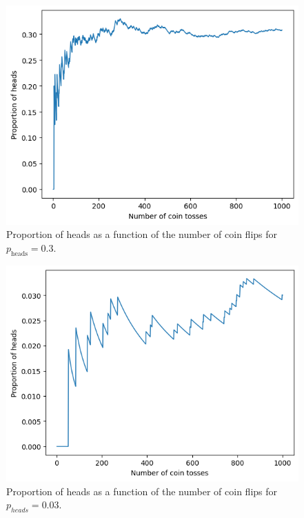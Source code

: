 \begin{ex}~
  \inputminted{python}{../code/01-21.py}

  \begin{figure}[H]
    \centering
    \includegraphics[scale=0.8]{../images/01-21a}
    \caption{Proportion of heads as a function of the number of coin flips for
      $p_\text{heads}=0.3$.}
  \end{figure}

  \begin{figure}[H]
    \centering
    \includegraphics[scale=0.8]{../images/01-21b}
    \caption{Proportion of heads as a function of the number of coin flips for
      $p_{heads}=0.03$.}
  \end{figure}

\end{ex}

